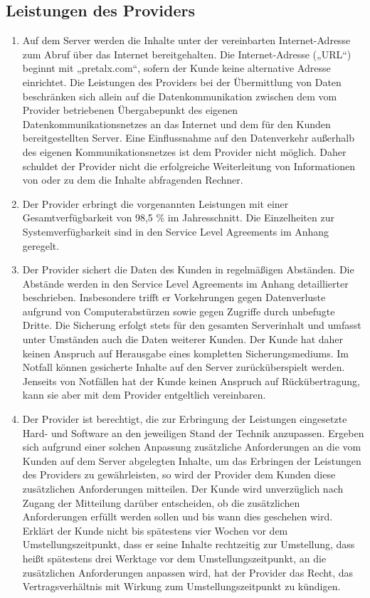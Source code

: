 \documentclass{terms}
\begin{document}
\subsection{Leistungen des Providers}
\begin{enumerate}
\item Auf dem Server werden die Inhalte unter der vereinbarten Internet-Adresse zum Abruf über das Internet bereitgehalten.
      Die Internet-Adresse („URL“) beginnt mit „pretalx.com“, sofern der Kunde keine alternative Adresse einrichtet.
      Die Leistungen des Providers bei der Übermittlung von Daten beschränken sich allein auf die Datenkommunikation zwischen dem vom Provider betriebenen Übergabepunkt des eigenen Datenkommunikationsnetzes an das Internet und dem für den Kunden bereitgestellten Server.
      Eine Einflussnahme auf den Datenverkehr außerhalb des eigenen Kommunikationsnetzes ist dem Provider nicht möglich.
      Daher schuldet der Provider nicht die erfolgreiche Weiterleitung von Informationen von oder zu dem die Inhalte abfragenden Rechner.
\item Der Provider erbringt die vorgenannten Leistungen mit einer Gesamtverfügbarkeit von 98,5 \% im Jahresschnitt.
      Die Einzelheiten zur Systemverfügbarkeit sind in den Service Level Agreements im Anhang geregelt.
\item Der Provider sichert die Daten des Kunden in regelmäßigen Abständen.
      Die Abstände werden in den Service Level Agreements im Anhang detaillierter beschrieben.
      Insbesondere trifft er Vorkehrungen gegen Datenverluste aufgrund von Computerabstürzen sowie gegen Zugriffe durch unbefugte Dritte.
      Die Sicherung erfolgt stets für den gesamten Serverinhalt und umfasst unter Umständen auch die Daten weiterer Kunden.
      Der Kunde hat daher keinen Anspruch auf Herausgabe eines kompletten Sicherungsmediums.
      Im Notfall können gesicherte Inhalte auf den Server zurücküberspielt werden.
      Jenseits von Notfällen hat der Kunde keinen Anspruch auf Rückübertragung, kann sie aber mit dem Provider entgeltlich vereinbaren.
\item Der Provider ist berechtigt, die zur Erbringung der Leistungen eingesetzte Hard- und Software an den jeweiligen Stand der Technik anzupassen.
      Ergeben sich aufgrund einer solchen Anpassung zusätzliche Anforderungen an die vom Kunden auf dem Server abgelegten Inhalte, um das Erbringen der Leistungen des Providers zu gewährleisten, so wird der Provider dem Kunden diese zusätzlichen Anforderungen mitteilen.
      Der Kunde wird unverzüglich nach Zugang der Mitteilung darüber entscheiden, ob die zusätzlichen Anforderungen erfüllt werden sollen und bis wann dies geschehen wird.
      Erklärt der Kunde nicht bis spätestens vier Wochen vor dem Umstellungszeitpunkt, dass er seine Inhalte rechtzeitig zur Umstellung, dass heißt spätestens drei Werktage vor dem Umstellungszeitpunkt, an die zusätzlichen Anforderungen anpassen wird, hat der Provider das Recht, das Vertragsverhältnis mit Wirkung zum Umstellungszeitpunkt zu kündigen.
\end{enumerate}
\end{document}
